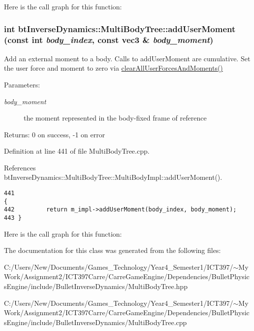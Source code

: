 Here is the call graph for this function:\hypertarget{classbt_inverse_dynamics_1_1_multi_body_tree_63096d466e1def1657da8eb3a99850fa}{
\subsubsection[addUserMoment]{\setlength{\rightskip}{0pt plus 5cm}int btInverseDynamics::MultiBodyTree::addUserMoment (const int {\em body\_\-index}, \/  const {\bf vec3} \& {\em body\_\-moment})}}
\label{classbt_inverse_dynamics_1_1_multi_body_tree_63096d466e1def1657da8eb3a99850fa}


Add an external moment to a body. Calls to addUserMoment are cumulative. Set the user force and moment to zero via \hyperlink{classbt_inverse_dynamics_1_1_multi_body_tree_66402f51ab131c39a4d309196ff7c743}{clearAllUserForcesAndMoments()} \begin{Desc}
\item[Parameters:]
\begin{description}
\item[{\em body\_\-moment}]the moment represented in the body-fixed frame of reference \end{description}
\end{Desc}
\begin{Desc}
\item[Returns:]0 on success, -1 on error \end{Desc}


Definition at line 441 of file MultiBodyTree.cpp.

References btInverseDynamics::MultiBodyTree::MultiBodyImpl::addUserMoment().

\begin{Code}\begin{verbatim}441                                                                               {
442         return m_impl->addUserMoment(body_index, body_moment);
443 }
\end{verbatim}
\end{Code}




Here is the call graph for this function:

The documentation for this class was generated from the following files:\begin{CompactItemize}
\item 
C:/Users/New/Documents/Games\_\-Technology/Year4\_\-Semester1/ICT397/$\sim$My Work/Assignment2/ICT397Carre/CarreGameEngine/Dependencies/BulletPhysicsEngine/include/BulletInverseDynamics/MultiBodyTree.hpp\item 
C:/Users/New/Documents/Games\_\-Technology/Year4\_\-Semester1/ICT397/$\sim$My Work/Assignment2/ICT397Carre/CarreGameEngine/Dependencies/BulletPhysicsEngine/include/BulletInverseDynamics/MultiBodyTree.cpp\end{CompactItemize}
